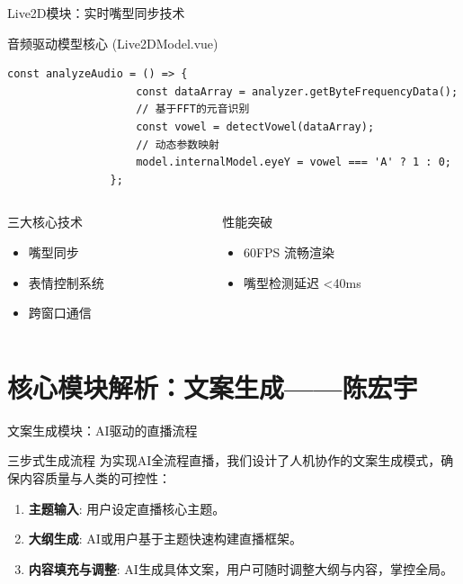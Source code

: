 \documentclass{beamer}
\begin{document}
	\begin{frame}[fragile]{Live2D模块：实时嘴型同步技术}
		\begin{block}{音频驱动模型核心 (Live2DModel.vue)}
			\begin{lstlisting}[style=jsstyle]
				const analyzeAudio = () => {
					const dataArray = analyzer.getByteFrequencyData();
					// 基于FFT的元音识别
					const vowel = detectVowel(dataArray); 
					// 动态参数映射
					model.internalModel.eyeY = vowel === 'A' ? 1 : 0; 
				};
			\end{lstlisting}
		\end{block}
		\begin{columns}[T]
			\begin{column}{0.5\textwidth}
				\begin{exampleblock}{三大核心技术}
					\begin{itemize}
						\item 嘴型同步
						\item 表情控制系统
						\item 跨窗口通信
					\end{itemize}
				\end{exampleblock}
			\end{column}
			\begin{column}{0.5\textwidth}
				\begin{exampleblock}{性能突破}
					\begin{itemize}
						\item 60FPS 流畅渲染
						\item 嘴型检测延迟 <40ms
					\end{itemize}
				\end{exampleblock}
			\end{column}
		\end{columns}
	\end{frame}
	
	\section{核心模块解析：文案生成——陈宏宇}
	
	\begin{frame}{文案生成模块：AI驱动的直播流程}
		
		\begin{exampleblock}{三步式生成流程}
			为实现AI全流程直播，我们设计了人机协作的文案生成模式，确保内容质量与人类的可控性：
			\begin{enumerate}
				\item \textbf{主题输入}: 用户设定直播核心主题。
				\item \textbf{大纲生成}: AI或用户基于主题快速构建直播框架。
				\item \textbf{内容填充与调整}: AI生成具体文案，用户可随时调整大纲与内容，掌控全局。
			\end{enumerate}
		\end{exampleblock}
	\end{frame}
	
\end{document}
